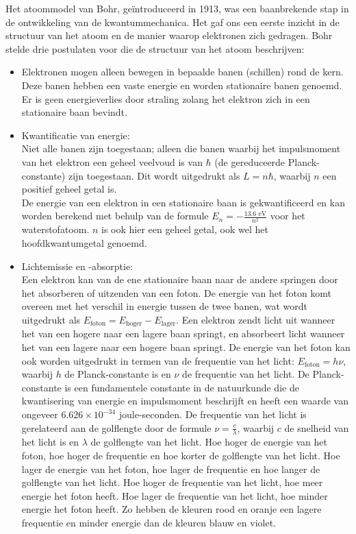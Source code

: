 \documentclass{report} %
\begin{document}
    Het atoommodel van Bohr, geïntroduceerd in 1913, was een baanbrekende stap in de ontwikkeling van de kwantummechanica.
    Het gaf ons een eerste inzicht in de structuur van het atoom en de manier waarop elektronen zich gedragen.
    Bohr stelde drie postulaten voor die de structuur van het atoom beschrijven:
    \begin{itemize}
        \item Elektronen mogen alleen bewegen in bepaalde banen (schillen) rond de kern.
        Deze banen hebben een vaste energie en worden stationaire banen genoemd.
        Er is geen energieverlies door straling zolang het elektron zich in een stationaire baan bevindt.
        \item Kwantificatie van energie: \\
        Niet alle banen zijn toegestaan; alleen die banen waarbij het impulsmoment van het elektron een geheel veelvoud is van $\hbar$ (de gereduceerde Planck-constante) zijn toegestaan. Dit wordt uitgedrukt als $L = n\hbar$, waarbij $n$ een positief geheel getal is.\\
        De energie van een elektron in een stationaire baan is gekwantificeerd en kan worden berekend met behulp van de formule $E_n = -\frac{13.6 \text{ eV}}{n^2}$ voor het waterstofatoom. $n$ is ook hier een geheel getal, ook wel het hoofdkwantumgetal genoemd.
        \item Lichtemissie en -absorptie: \\
        Een elektron kan van de ene stationaire baan naar de andere springen door het absorberen of uitzenden van een foton.
        De energie van het foton komt overeen met het verschil in energie tussen de twee banen, wat wordt uitgedrukt als $E_{\text{foton}} = E_{\text{hoger}} - E_{\text{lager}}$.
        Een elektron zendt licht uit wanneer het van een hogere naar een lagere baan springt, en absorbeert licht wanneer het van een lagere naar een hogere baan springt.
        De energie van het foton kan ook worden uitgedrukt in termen van de frequentie van het licht: $E_{\text{foton}} = h\nu$, waarbij $h$ de Planck-constante is en $\nu$ de frequentie van het licht.
        De Planck-constante is een fundamentele constante in de natuurkunde die de kwantisering van energie en impulsmoment beschrijft en heeft een waarde van ongeveer $6.626 \times 10^{-34}$ joule-seconden.
        De frequentie van het licht is gerelateerd aan de golflengte door de formule $\nu = \frac{c}{\lambda}$, waarbij $c$ de snelheid van het licht is en $\lambda$ de golflengte van het licht.
        Hoe hoger de energie van het foton, hoe hoger de frequentie en hoe korter de golflengte van het licht. Hoe lager de energie van het foton, hoe lager de frequentie en hoe langer de golflengte van het licht.
        Hoe hoger de frequentie van het licht, hoe meer energie het foton heeft. Hoe lager de frequentie van het licht, hoe minder energie het foton heeft. Zo hebben de kleuren rood en oranje een lagere frequentie en minder energie dan de kleuren blauw en violet.
    \end{itemize}
\end{document}
